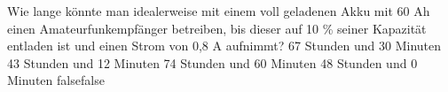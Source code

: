     {Wie lange könnte man idealerweise mit einem voll geladenen Akku mit 60 Ah einen Amateurfunkempfänger betreiben, bis dieser auf 10 \% seiner Kapazität entladen ist und einen Strom von 0,8 A aufnimmt?}
    {67 Stunden und 30 Minuten}
    {43 Stunden und 12 Minuten}
    {74 Stunden und 60 Minuten}
    {48 Stunden und 0 Minuten}
    {false}{false}